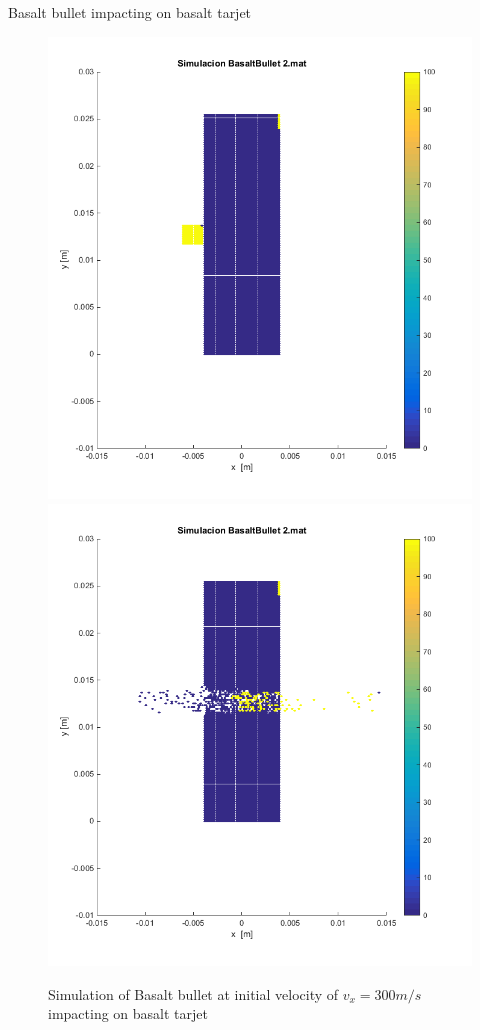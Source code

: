 \documentclass[10pt]{beamer}
\begin{document}
\begin{frame}{Basalt bullet impacting on basalt tarjet}
\begin{figure}[h!]
\includegraphics[scale=.25]{./images/BonB_i.png}
\includegraphics[scale=.25]{./images/BonB_f.png}
\caption{Simulation of Basalt bullet at initial velocity of $v_x=300 m/s$ impacting on basalt tarjet}
\end{figure}
\end{frame}
\end{document}
